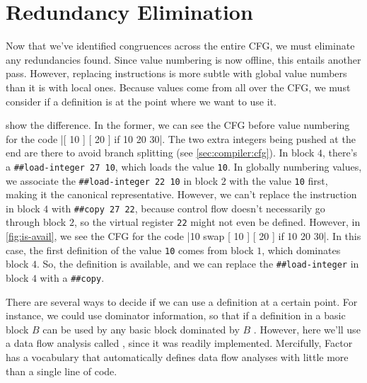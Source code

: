 \section{Redundancy Elimination}\label{sec:vn:avail}

Now that we've identified congruences across the entire \gls{CFG}, we must
eliminate any redundancies found.  Since value numbering is now offline, this
entails another pass.  However, replacing instructions is more subtle with
global value numbers than it is with local ones.  Because values come from all
over the \gls{CFG}, we must consider if a definition is  at the
point where we want to use it.  


 show the difference.  In the former, we can
see the \gls{CFG} before value numbering for the code
%
\factor|[ 10 ] [ 20 ] if 10 20 30|.
%
The two extra integers being pushed at the end are there to avoid branch
splitting (see \vref{sec:compiler:cfg}).  In block $4$, there's a
%
\Verb|##load-integer 27 10|,
%
which loads the value \Verb|10|.  In globally numbering values, we associate
the
%
\Verb|##load-integer 22 10|
%
in block $2$ with the value \Verb|10| first, making it the canonical
representative.  However, we can't replace the instruction in block $4$ with
%
\Verb|##copy 27 22|,
%
because control flow doesn't necessarily go through block $2$, so the virtual
register \Verb|22| might not even be defined.  However, in
\vref{fig:is-avail}, we see the \gls{CFG} for the code
%
\factor|10 swap [ 10 ] [ 20 ] if 10 20 30|.
%
In this case, the first definition of the value \Verb|10| comes from block
$1$, which dominates block $4$.  So, the definition is available, and we can
replace the \Verb|##load-integer| in block $4$ with a \Verb|##copy|.

There are several ways to decide if we can use a definition at a certain point.
For instance, we could use dominator information, so that if a definition in a
basic block $B$ can be used by any basic block dominated by $B$
\autocite{Simpson}.  However, here we'll use a data flow analysis called
, since it was readily implemented.
Mercifully, Factor has a vocabulary that automatically defines data flow
analyses with little more than a single line of code.


